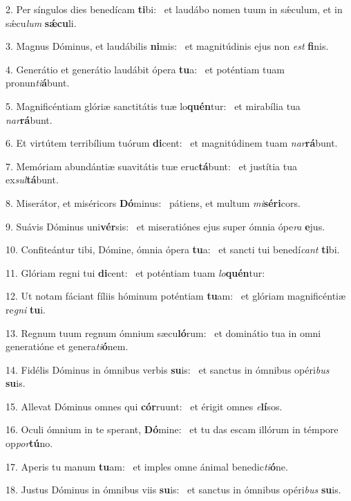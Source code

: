 2. Per síngulos dies benedícam \textbf{ti}bi: \ast\  et laudábo nomen tuum in sǽculum, et in sǽcu\textit{lum} \textbf{sǽ}\textbf{cu}li.\

3. Magnus Dóminus, et laudábilis \textbf{ni}mis: \ast\  et magnitúdinis ejus non \textit{est} \textbf{fi}nis.\

4. Generátio et generátio laudábit ópera \textbf{tu}a: \ast\  et poténtiam tuam pronun\textit{ti}\textbf{á}bunt.\

5. Magnificéntiam glóriæ sanctitátis tuæ lo\textbf{quén}tur: \ast\  et mirabília tua \textit{nar}\textbf{rá}bunt.\

6. Et virtútem terribílium tuórum \textbf{di}cent: \ast\  et magnitúdinem tuam \textit{nar}\textbf{rá}bunt.\

7. Memóriam abundántiæ suavitátis tuæ eruc\textbf{tá}bunt: \ast\  et justítia tua ex\textit{sul}\textbf{tá}bunt.\

8. Miserátor, et miséricors \textbf{Dó}minus: \ast\  pátiens, et multum \textit{mi}\textbf{sé}\textbf{ri}cors.\

9. Suávis Dóminus uni\textbf{vér}sis: \ast\  et miseratiónes ejus super ómnia ópe\textit{ra} \textbf{e}jus.\

10. Confiteántur tibi, Dómine, ómnia ópera \textbf{tu}a: \ast\  et sancti tui benedí\textit{cant} \textbf{ti}bi.\

11. Glóriam regni tui \textbf{di}cent: \ast\  et poténtiam tuam \textit{lo}\textbf{quén}tur:\

12. Ut notam fáciant fíliis hóminum poténtiam \textbf{tu}am: \ast\  et glóriam magnificéntiæ re\textit{gni} \textbf{tu}i.\

13. Regnum tuum regnum ómnium sæcu\textbf{ló}rum: \ast\  et dominátio tua in omni generatióne et genera\textit{ti}\textbf{ó}nem.\

14. Fidélis Dóminus in ómnibus verbis \textbf{su}is: \ast\  et sanctus in ómnibus opéri\textit{bus} \textbf{su}is.\

15. Allevat Dóminus omnes qui \textbf{cór}ruunt: \ast\  et érigit omnes \textit{e}\textbf{lí}sos.\

16. Oculi ómnium in te sperant, \textbf{Dó}mine: \ast\  et tu das escam illórum in témpore op\textit{por}\textbf{tú}no.\

17. Aperis tu manum \textbf{tu}am: \ast\  et imples omne ánimal benedic\textit{ti}\textbf{ó}ne.\

18. Justus Dóminus in ómnibus viis \textbf{su}is: \ast\  et sanctus in ómnibus opéri\textit{bus} \textbf{su}is.\

